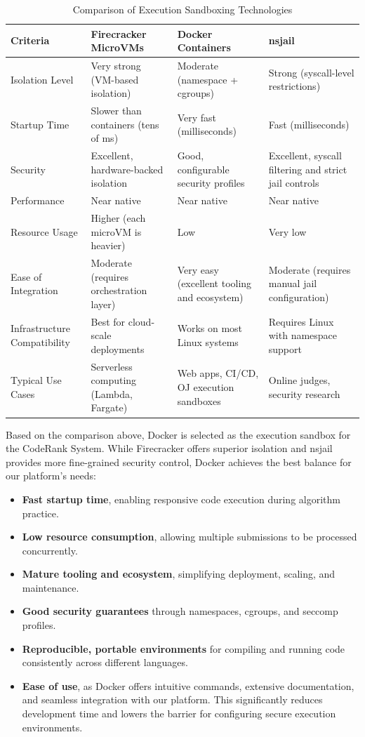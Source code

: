 \begin{table}[h!]
\centering
\begin{tabular}{|p{3cm}|p{3.5cm}|p{3.5cm}|p{3.5cm}|}
\hline
\textbf{Criteria} & \textbf{Firecracker MicroVMs} & \textbf{Docker Containers} & \textbf{nsjail} \\
\hline
Isolation Level & Very strong (VM-based isolation) & Moderate (namespace + cgroups) & Strong (syscall-level restrictions) \\
\hline
Startup Time & Slower than containers (tens of ms) & Very fast (milliseconds) & Fast (milliseconds) \\
\hline
Security & Excellent, hardware-backed isolation & Good, configurable security profiles & Excellent, syscall filtering and strict jail controls \\
\hline
Performance & Near native & Near native & Near native \\
\hline
Resource Usage & Higher (each microVM is heavier) & Low & Very low \\
\hline
Ease of Integration & Moderate (requires orchestration layer) & Very easy (excellent tooling and ecosystem) & Moderate (requires manual jail configuration) \\
\hline
Infrastructure Compatibility & Best for cloud-scale deployments & Works on most Linux systems & Requires Linux with namespace support \\
\hline
Typical Use Cases & Serverless computing (Lambda, Fargate) & Web apps, CI/CD, OJ execution sandboxes & Online judges, security research \\
\hline
\end{tabular}
\caption{Comparison of Execution Sandboxing Technologies}
\end{table}

Based on the comparison above, Docker is selected as the execution sandbox for the CodeRank System. While Firecracker offers superior isolation and nsjail provides more fine-grained security control, Docker achieves the best balance for our platform’s needs:

\begin{itemize}
    \item \textbf{Fast startup time}, enabling responsive code execution during algorithm practice.
    \item \textbf{Low resource consumption}, allowing multiple submissions to be processed concurrently.
    \item \textbf{Mature tooling and ecosystem}, simplifying deployment, scaling, and maintenance.
    \item \textbf{Good security guarantees} through namespaces, cgroups, and seccomp profiles.
    \item \textbf{Reproducible, portable environments} for compiling and running code consistently across different languages.
    \item \textbf{Ease of use}, as Docker offers intuitive commands, extensive documentation, and seamless integration with our platform. This significantly reduces development time and lowers the barrier for configuring secure execution environments.
\end{itemize}
